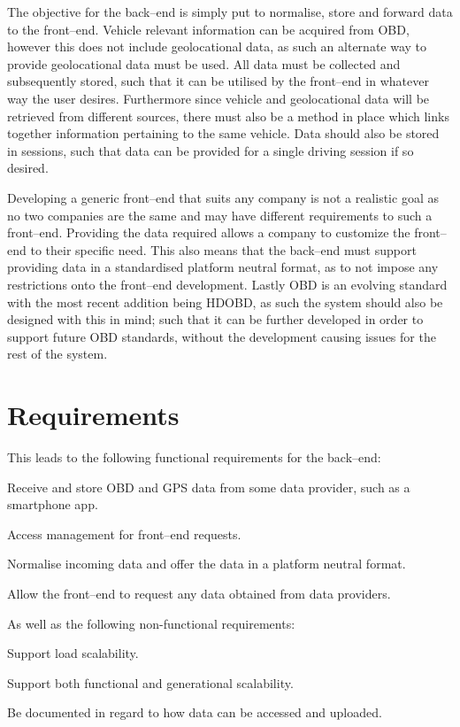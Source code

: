 \bigskip
The objective for the back--end is simply put to normalise, store and forward data to the front--end.
Vehicle relevant information can be acquired from \ac{OBD}, however this does not include geolocational data, as such an alternate way to provide geolocational data must be used.
All data must be collected and subsequently stored, such that it can be utilised by the front--end in whatever way the user desires.
Furthermore since vehicle and geolocational data will be retrieved from different sources, there must also be a method in place which links together information pertaining to the same vehicle.
Data should also be stored in sessions, such that data can be provided for a single driving session if so desired.

Developing a generic front--end that suits any company is not a realistic goal as no two companies are the same and may have different requirements to such a front--end.
Providing the data required allows a company to customize the front--end to their specific need.
This also means that the back--end must support providing data in a standardised platform neutral format, as to not impose any restrictions onto the front--end development.
Lastly \ac{OBD} is an evolving standard with the most recent addition being \ac{HDOBD}, as such the system should also be designed with this in mind; such that it can be further developed in order to support future \ac{OBD} standards, without the development causing issues for the rest of the system.

\section{Requirements}\label{sec:requirements}
This leads to the following functional requirements for the back--end:
\begin{eletterate}
    \item Receive and store \ac{OBD} and GPS data from some data provider, such as a smartphone app.
    \item Access management for front--end requests.
    \item Normalise incoming data and offer the data in a platform neutral format. %
    \item Allow the front--end to request any data obtained from data providers.
\end{eletterate}
As well as the following non-functional requirements:
\begin{eletterate}[resume]
    \item Support load scalability.%
    \item Support both functional and generational scalability.
    \item Be documented in regard to how data can be accessed and uploaded.
\end{eletterate}



